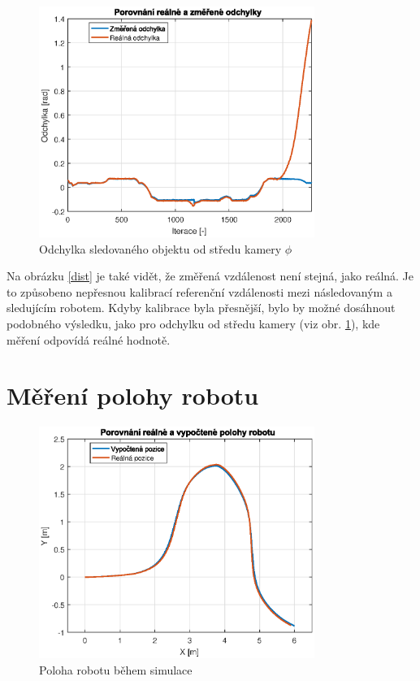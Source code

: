 \documentclass[twoside]{ctuthesis}
\theoremstyle{plain}
\theoremstyle{definition}
\theoremstyle{note}
\begin{document}
\begin{figure}[hbt]
	\caption{Odchylka sledovaného objektu od středu kamery $\phi$}

	\label{odch}
	\includegraphics[width=0.8\textwidth]{images/5/odchylka.eps}
\end{figure}
Na obrázku \ref{dist} je také vidět, že změřená vzdálenost není stejná, jako reálná. Je to způsobeno nepřesnou kalibrací referenční vzdálenosti mezi následovaným a sledujícím robotem. Kdyby kalibrace byla přesnější, bylo by možné dosáhnout podobného výsledku, jako pro odchylku od středu kamery (viz obr. \ref{odch}), kde měření odpovídá reálné hodnotě.

\section{Měření polohy robotu}

\begin{figure}
	\caption{Poloha robotu během simulace}

	\label{rob_pos}
	\includegraphics[width=0.8\textwidth]{images/5/pos_rob.eps}
\end{figure}
\end{document}
